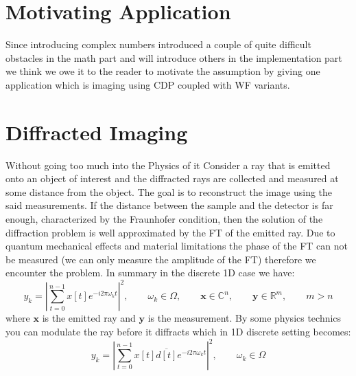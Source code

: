 \section{Motivating Application}\label{sec:motivating_application}

Since introducing complex numbers introduced a couple of quite difficult obstacles in the math part and will introduce others in the implementation part 
we think we owe it to the reader to motivate the assumption by giving one application which is imaging using \ac{CDP} coupled with \ac{WF} variants.

\section{Diffracted Imaging}\label{sec:diffracted_imaging}



Without going too much into the Physics of it Consider a ray that is emitted onto an object of interest and the diffracted rays are collected and 
measured at some distance from the object. The goal is to reconstruct the image using the said measurements. If the distance between 
the sample and the detector is far enough, characterized by the Fraunhofer condition\cite{Lipson1995}, then the solution of the diffraction 
problem is well approximated by the \ac{FT} of the emitted ray. Due to quantum mechanical effects\cite{DGDS2018}\cite{FranzSchwabl2007} and material limitations\cite{Shechtman2015} 
the phase of the \ac{FT} can not be measured (we can only measure the amplitude of the \ac{FT}) therefore we encounter the \pp problem. In summary in the discrete 1D case we have:
\begin{equation}
	y_k = \left| \sum_{t=0}^{n-1} x[t] e^{-i2\pi\omega_kt} \right|^2 , \qquad \omega_k \in \Omega, \qquad \boldsymbol{x} \in \mathbb{C}^n , \qquad \boldsymbol{y} \in \mathbb{R}^m, \qquad m > n 
\end{equation}
where $\boldsymbol{x}$ is the emitted ray and $\boldsymbol{y}$ is the measurement. By some physics technics\cite{Loewen2018}\cite{Candes2011} you can modulate 
the ray before it diffracts which in 1D discrete setting becomes:
\begin{equation}\label{eq:modulation_effect}
	y_k = \left| \sum_{t=0}^{n-1} x[t]\overline{d[t]} e^{-i2\pi\omega_kt} \right|^2 , \qquad \omega_k \in \Omega
\end{equation}

